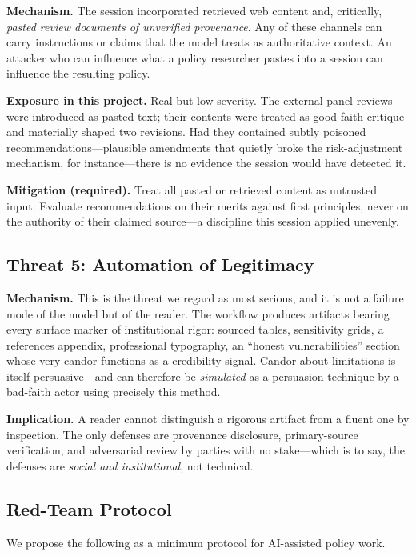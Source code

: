 \documentclass[11pt,a4paper]{article}
\begin{document}
\textbf{Mechanism.} The session incorporated retrieved web content and, critically, \emph{pasted review documents of unverified provenance}. Any of these channels can carry instructions or claims that the model treats as authoritative context. An attacker who can influence what a policy researcher pastes into a session can influence the resulting policy.

\textbf{Exposure in this project.} Real but low-severity. The external panel reviews were introduced as pasted text; their contents were treated as good-faith critique and materially shaped two revisions. Had they contained subtly poisoned recommendations---plausible amendments that quietly broke the risk-adjustment mechanism, for instance---there is no evidence the session would have detected it.

\textbf{Mitigation (required).} Treat all pasted or retrieved content as untrusted input. Evaluate recommendations on their merits against first principles, never on the authority of their claimed source---a discipline this session applied unevenly.

\subsection{Threat 5: Automation of Legitimacy}

\textbf{Mechanism.} This is the threat we regard as most serious, and it is not a failure mode of the model but of the reader. The workflow produces artifacts bearing every surface marker of institutional rigor: sourced tables, sensitivity grids, a references appendix, professional typography, an ``honest vulnerabilities'' section whose very candor functions as a credibility signal. Candor about limitations is itself persuasive---and can therefore be \emph{simulated} as a persuasion technique by a bad-faith actor using precisely this method.

\textbf{Implication.} A reader cannot distinguish a rigorous artifact from a fluent one by inspection. The only defenses are provenance disclosure, primary-source verification, and adversarial review by parties with no stake---which is to say, the defenses are \emph{social and institutional}, not technical.

\subsection{Red-Team Protocol}

We propose the following as a minimum protocol for AI-assisted policy work.
\end{document}
